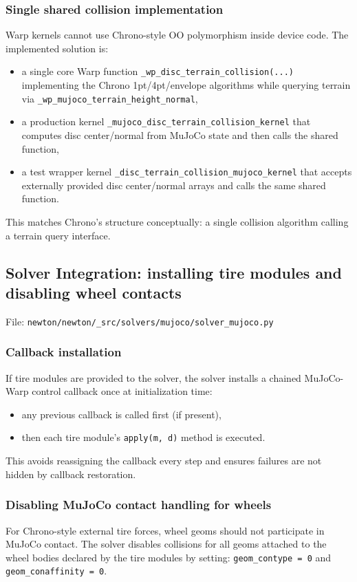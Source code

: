 \subsubsection{Single shared collision implementation}
Warp kernels cannot use Chrono-style OO polymorphism inside device code. The implemented solution is:
\begin{itemize}
  \item a single core Warp function \texttt{\_wp\_disc\_terrain\_collision(...)} implementing the Chrono
        1pt/4pt/envelope algorithms while querying terrain via \texttt{\_wp\_mujoco\_terrain\_height\_normal},
  \item a production kernel \texttt{\_mujoco\_disc\_terrain\_collision\_kernel} that computes disc center/normal
        from MuJoCo state and then calls the shared function,
  \item a test wrapper kernel \texttt{\_disc\_terrain\_collision\_mujoco\_kernel} that accepts externally provided
        disc center/normal arrays and calls the same shared function.
\end{itemize}
This matches Chrono's structure conceptually: a single collision algorithm calling a terrain query interface.

\subsection{Solver Integration: installing tire modules and disabling wheel contacts}
\label{sec:substep4-solver}
File: \texttt{newton/newton/\_src/solvers/mujoco/solver\_mujoco.py}

\subsubsection{Callback installation}
If tire modules are provided to the solver, the solver installs a chained MuJoCo-Warp control callback once
at initialization time:
\begin{itemize}
  \item any previous callback is called first (if present),
  \item then each tire module's \texttt{apply(m, d)} method is executed.
\end{itemize}
This avoids reassigning the callback every step and ensures failures are not hidden by callback restoration.

\subsubsection{Disabling MuJoCo contact handling for wheels}
For Chrono-style external tire forces, wheel geoms should not participate in MuJoCo contact.
The solver disables collisions for all geoms attached to the wheel bodies declared by the tire modules by setting:
\texttt{geom\_contype = 0} and \texttt{geom\_conaffinity = 0}.

